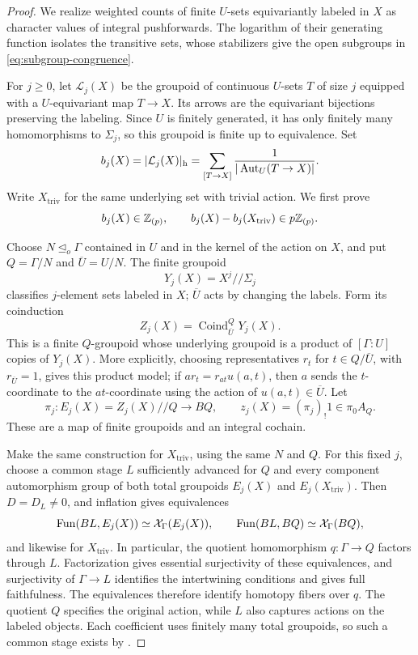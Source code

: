 \begin{proof}
We realize weighted counts of finite $U$-sets equivariantly labeled in
$X$ as character values of integral pushforwards. The logarithm of
their generating function isolates the transitive sets, whose
stabilizers give the open subgroups in \eqref{eq:subgroup-congruence}.

For $j\geq0$, let $\mathcal L_j(X)$ be the groupoid of continuous
$U$-sets $T$ of size $j$ equipped with a $U$-equivariant map $T\to X$.
Its arrows are the equivariant bijections preserving the labeling.  Since
$U$ is finitely generated, it has only finitely many homomorphisms to
$\Sigma_j$, so this groupoid is finite up to equivalence.  Set
\begin{equation}\label{eq:labeled-count}
 b_j(X)=|\mathcal L_j(X)|_{\mathrm h}
       =\sum_{[T\to X]}\frac1{|\operatorname{Aut}_U(T\to X)|}.
\end{equation}
Write $X_{\mathrm{triv}}$ for the same underlying set with trivial action.
We first prove
\begin{equation}\label{eq:labeled-integrality}
 b_j(X)\in\mathbb Z_{(p)},\qquad
 b_j(X)-b_j(X_{\mathrm{triv}})\in p\mathbb Z_{(p)}.
\end{equation}

Choose $N\trianglelefteq_o\Gamma$ contained in $U$ and in the kernel of
the action on $X$, and put $Q=\Gamma/N$ and $\overline U=U/N$.
The finite groupoid
\[
 Y_j(X)=X^j\mathbin{//}\Sigma_j
\]
classifies $j$-element sets labeled in $X$; $\overline U$ acts by changing
the labels.  Form its coinduction
\[
 Z_j(X)=\operatorname{Coind}_{\overline U}^{Q}Y_j(X).
\]
This is a finite $Q$-groupoid whose underlying groupoid is a product of
$[\Gamma:U]$ copies of $Y_j(X)$.  More explicitly, choosing representatives
$r_t$ for $t\in Q/\overline U$, with $r_{\overline U}=1$, gives this product
model; if
$a r_t=r_{at}u(a,t)$, then $a$ sends the $t$-coordinate to the
$at$-coordinate using the action of $u(a,t)\in\overline U$.
Let
\[
 \pi_j:E_j(X)=Z_j(X)\mathbin{//}Q\longrightarrow BQ,
 \qquad z_j(X)=(\pi_j)_!1\in\pi_0A_Q.
\]
These are a map of finite groupoids and an integral cochain.

Make the same construction for $X_{\mathrm{triv}}$, using the same $N$ and
$Q$.  For this fixed $j$, choose a common stage $L$ sufficiently advanced
for $Q$ and every component automorphism group of both total groupoids
$E_j(X)$ and $E_j(X_{\mathrm{triv}})$.  Then $D=D_L\ne0$, and inflation gives
equivalences
\[
 \operatorname{Fun}(BL,E_j(X))\simeq\mathcal X_\Gamma(E_j(X)),
 \qquad
 \operatorname{Fun}(BL,BQ)\simeq\mathcal X_\Gamma(BQ),
\]
and likewise for $X_{\mathrm{triv}}$.
In particular, the quotient homomorphism $q:\Gamma\to Q$ factors through
$L$.  Factorization gives essential surjectivity of these equivalences,
and surjectivity of $\Gamma\to L$ identifies the intertwining conditions
and gives full faithfulness.  The equivalences therefore identify homotopy
fibers over $q$.
The quotient $Q$ specifies the original action, while $L$ also captures
actions on the labeled objects.  Each coefficient uses finitely many total
groupoids, so such a common stage exists by .


\end{proof}
